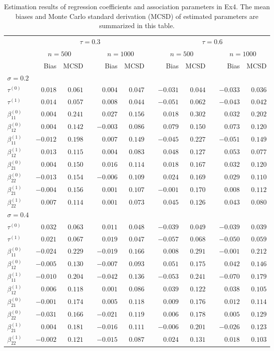 \documentclass[12pt]{article}
\begin{document}
\begin{table}[htbp]
\begin{center}
\caption{Estimation results of regression coefficients and association parameters in  Ex4. The mean biases and Monte Carlo standard derivation (MCSD) of estimated parameters are summarized in this table.}
\label{tab:est_coef_ex4}
\begin{tabular}{lrrrrrrrrrrrr}
\hline\hline
& &\multicolumn{5}{c}{$\tau=0.3$}&&\multicolumn{5}{c}{$\tau=0.6$}\tabularnewline
\cline{3-7}\cline{9-13}
& &\multicolumn{2}{c}{$n=500$}&&\multicolumn{2}{c}{$n=1000$}&&\multicolumn{2}{c}{$n=500$}&&\multicolumn{2}{c}{$n=1000$}\tabularnewline
\cline{3-4}\cline{6-7}\cline{9-10}
\cline{12-13}
 && Bias& MCSD&& Bias& MCSD&& Bias& MCSD&& Bias& MCSD \tabularnewline
\hline
\multicolumn{5}{l}{$\sigma=0.2$}\tabularnewline
$\tau^{(0)}$ &&$ 0.018$&$0.061$&&$ 0.004$&$0.047$&&$-0.031$&$0.044$&&$-0.033$&$0.036$\tabularnewline
$\tau^{(1)}$&&$ 0.014$&$0.057$&&$ 0.008$&$0.044$&&$-0.051$&$0.062$&&$-0.043$&$0.042$\tabularnewline
$\beta_{11}^{(0)}$&&$ 0.004$&$0.241$&&$ 0.027$&$0.156$&&$ 0.018$&$0.302$&&$ 0.032$&$0.202$\tabularnewline
$\beta_{12}^{(0)}$&&$ 0.004$&$0.142$&&$-0.003$&$0.086$&&$ 0.079$&$0.150$&&$ 0.073$&$0.120$\tabularnewline
$\beta_{11}^{(1)}$&&$-0.012$&$0.198$&&$ 0.007$&$0.149$&&$-0.045$&$0.227$&&$-0.051$&$0.149$\tabularnewline
$\beta_{12}^{(1)}$&&$ 0.013$&$0.115$&&$ 0.004$&$0.083$&&$ 0.048$&$0.127$&&$ 0.053$&$0.077$\tabularnewline
$\beta_{21}^{(0)}$&&$ 0.004$&$0.150$&&$ 0.016$&$0.114$&&$ 0.018$&$0.167$&&$ 0.032$&$0.120$\tabularnewline
$\beta_{22}^{(0)}$&&$-0.013$&$0.154$&&$-0.006$&$0.109$&&$ 0.024$&$0.169$&&$ 0.029$&$0.110$\tabularnewline
$\beta_{21}^{(1)}$&&$-0.004$&$0.156$&&$ 0.001$&$0.107$&&$-0.001$&$0.170$&&$ 0.008$&$0.112$\tabularnewline
$\beta_{22}^{(1)}$&&$ 0.007$&$0.114$&&$ 0.001$&$0.073$&&$ 0.045$&$0.126$&&$ 0.043$&$0.080$\tabularnewline
\hline
\multicolumn{5}{l}{$\sigma=0.4$}\tabularnewline
$\tau^{(0)}$ &&$ 0.032$&$0.063$&&$ 0.011$&$0.048$&&$-0.039$&$0.049$&&$-0.039$&$0.039$\tabularnewline
$\tau^{(1)}$ &&$ 0.021$&$0.067$&&$ 0.019$&$0.047$&&$-0.057$&$0.068$&&$-0.050$&$0.059$\tabularnewline
$\beta_{11}^{(0)}$&&$-0.024$&$0.229$&&$-0.019$&$0.166$&&$ 0.008$&$0.291$&&$-0.001$&$0.212$\tabularnewline
$\beta_{12}^{(0)}$&&$-0.005$&$0.130$&&$-0.007$&$0.093$&&$ 0.051$&$0.175$&&$ 0.042$&$0.146$\tabularnewline
$\beta_{11}^{(1)}$&&$-0.010$&$0.204$&&$-0.042$&$0.136$&&$-0.053$&$0.241$&&$-0.070$&$0.179$\tabularnewline
$\beta_{12}^{(1)}$&&$ 0.006$&$0.118$&&$ 0.001$&$0.086$&&$ 0.039$&$0.122$&&$ 0.038$&$0.105$\tabularnewline
$\beta_{21}^{(0)}$&&$-0.001$&$0.174$&&$ 0.005$&$0.118$&&$ 0.009$&$0.176$&&$ 0.012$&$0.114$\tabularnewline
$\beta_{22}^{(0)}$&&$-0.031$&$0.166$&&$-0.021$&$0.119$&&$ 0.006$&$0.178$&&$ 0.005$&$0.129$\tabularnewline
$\beta_{21}^{(1)}$&&$ 0.004$&$0.181$&&$-0.016$&$0.111$&&$-0.006$&$0.201$&&$-0.026$&$0.123$\tabularnewline
$\beta_{22}^{(1)}$&&$-0.002$&$0.121$&&$-0.015$&$0.087$&&$ 0.024$&$0.131$&&$ 0.018$&$0.103$\tabularnewline
\hline
\end{tabular}\end{center}
\end{table}
\end{document}
